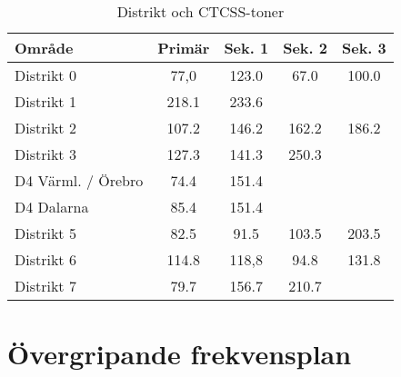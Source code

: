 \begin{table}[H]
\centering
\begin{tabular}{lcccc}
	\textbf{Område}    & \textbf{Primär} & \textbf{Sek. 1} & \textbf{Sek. 2} & \textbf{Sek. 3} \\ \hline
	Distrikt 0         & 77,0            & 123.0           & 67.0            & 100.0           \\
	Distrikt 1         & 218.1           & 233.6           &                 &                 \\
	Distrikt 2         & 107.2           & 146.2           & 162.2           & 186.2           \\
	Distrikt 3         & 127.3           & 141.3           & 250.3           &                 \\
	D4 Värml. / Örebro & 74.4            & 151.4           &                 &                 \\
	D4 Dalarna         & 85.4            & 151.4           &                 &                 \\
	Distrikt 5         & 82.5            & 91.5            & 103.5           & 203.5           \\
	Distrikt 6         & 114.8           & 118,8           & 94.8            & 131.8           \\
	Distrikt 7         & 79.7            & 156.7           & 210.7           &
\end{tabular}
\caption{Distrikt och CTCSS-toner}
\end{table}

\section{Övergripande frekvensplan}

